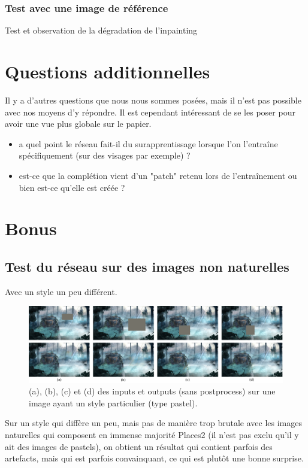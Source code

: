 \documentclass[12pt]{article}
\begin{document}
\subsubsection{Test avec une image de référence}
Test et observation de la dégradation de l'inpainting

\section{Questions additionnelles}

Il y a d'autres questions que nous nous sommes posées, mais il n'est pas possible avec nos moyens d'y répondre. Il est cependant intéressant de se les poser pour avoir une vue plus globale sur le papier.
\begin{itemize}
    \item a quel point le réseau fait-il du surapprentissage lorsque l'on l'entraîne spécifiquement (sur des visages par exemple) ?
    \item est-ce que la complétion vient d'un "patch" retenu lors de l'entraînement ou bien est-ce qu'elle est créée ?
\end{itemize}

\section{Bonus}

\subsection{Test du réseau sur des images non naturelles}

Avec un style un peu différent.

\begin{figure}[H]
    \includegraphics[width=1.0\textwidth]{Images/Col.png}
    \caption{(a), (b), (c) et (d) des inputs et outputs (sans postprocess) sur une image ayant un style particulier (type pastel).}
\end{figure}

Sur un style qui diffère un peu, mais pas de manière trop brutale avec les images naturelles qui composent en immense majorité Places2 (il n'est pas exclu qu'il y ait des images de pastels), on obtient un résultat qui contient parfois des artefacts, mais qui est parfois convainquant, ce qui est plutôt une bonne surprise.
\end{document}
